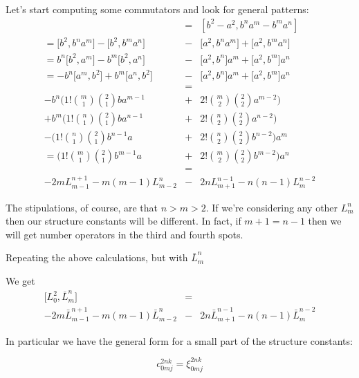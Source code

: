\documentclass{article}
\newcommand{\lrbrack}[2]{\lbrack #1 , #2 \rbrack}
\begin{document}
Let's start computing some commutators and look for general patterns:
\begin{eqnarray*}
[L_0^2, L_m^n] & = & [b^2-a^2, b^n a^m - b^m a^n]\\
=\lbrack b^2, b^n a^m \rbrack - \lbrack b^2, b^m a^n \rbrack & - & \lbrack a^2,b^n a^m \rbrack + \lbrack a^2, b^m a^n \rbrack \\
=b^n\lrbrack{b^2}{a^m} - b^m \lrbrack{b^2}{a^n} & - & \lrbrack{a^2}{b^n} a^m + \lrbrack{a^2}{b^m} a^n\\
=-b^n\lrbrack{a^m}{b^2} + b^m \lrbrack{a^n}{b^2} & - & \lrbrack{a^2}{b^n} a^m + \lrbrack{a^2}{b^m} a^n\\
& = & \\
 -b^n(1!{m \choose 1}{2 \choose 1}b a^{m-1} &+& 2!{m \choose 2}{2 \choose 2}a^{m-2})\\
+ b^m(1!{n \choose 1}{2 \choose 1}b a^{n-1} &+& 2!{n \choose 2}{2 \choose 2}a^{n-2})\\
- (1!{n \choose 1}{2 \choose 1}b^{n-1} a &+& 2!{n \choose 2}{2 \choose 2}b^{n-2}) a^m\\
= (1!{m \choose 1}{2 \choose 1}b^{m-1} a &+& 2!{m \choose 2}{2 \choose 2}b^{m-2}) a^n\\
& = & \\
- 2m L_{m-1}^{n+1} - m(m-1) L_{m-2}^{n} &-& 2n L_{m+1}^{n-1} - n(n-1)L_{m}^{n-2}
\end{eqnarray*}

The stipulations, of course, are that $n>m>2$.  If we're considering any other $L_m^n$ then our structure constants will be different.  In fact, if $m+1 = n-1$ then we will get number operators in the third and fourth spots.

Repeating the above calculations, but with $\bar{L}_m^n$

We get
\begin{eqnarray*}
\lrbrack{L_0^2}{\bar{L}_m^n} & = &\\
- 2m \bar{L}_{m-1}^{n+1} - m(m-1) \bar{L}_{m-2}^{n} &-& 2n \bar{L}_{m+1}^{n-1} - n(n-1)\bar{L}_{m}^{n-2}
\end{eqnarray*}


In particular we have the general form for a small part of the structure constants:

\begin{equation}
c_{0mj}^{2nk} = \xi_{0mj}^{2nk}
\end{equation}
\end{document}
